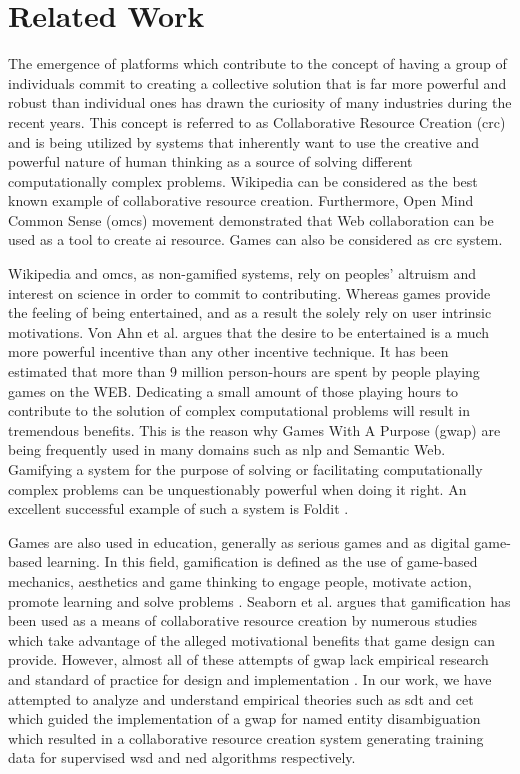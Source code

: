 \section{Related Work}
\label{game:relate-work}
The emergence of platforms which contribute to the concept of having a group of individuals commit to creating a collective solution that is far more powerful and robust than individual ones has drawn the curiosity of many industries during the recent years. This concept is referred to as Collaborative Resource Creation (\ac{crc}) and is being utilized by systems that inherently want to use the creative and powerful nature of human thinking as a source of solving different computationally complex problems. Wikipedia can be considered as the best known example of collaborative resource creation. Furthermore, Open Mind Common Sense (\ac{omcs}) movement demonstrated that Web collaboration can be used as a tool to create \ac{ai} resource. Games can also be considered as \ac{crc} system. \cite{44, 43}

Wikipedia and \ac{omcs}, as non-gamified systems, rely on peoples' altruism and interest on science in order to commit to contributing. Whereas games provide the feeling of being entertained, and as a result the solely rely on user intrinsic motivations. Von Ahn et al. \cite{vonahn} argues that the desire to be entertained is a much more powerful incentive than any other incentive technique. It has been estimated that more than 9 million person-hours are spent by people playing games on the WEB. Dedicating a small amount of those playing hours to contribute to the solution of complex computational problems will result in tremendous benefits. This is the reason why Games With A Purpose (\ac{gwap}) are being frequently used in many domains such as \ac{nlp} and Semantic Web. Gamifying a system for the purpose of solving or facilitating computationally complex problems can be unquestionably powerful when doing it right. An excellent successful example of such a system is Foldit \cite{53}. 

Games are also used in education, generally as serious games and as digital game-based learning. In this field, gamification is defined as the use of game-based mechanics, aesthetics and game thinking to engage people, motivate action, promote learning and solve problems \cite{47}. Seaborn et al. \cite{47} argues that gamification has been used as a means of collaborative resource creation by numerous studies which take advantage of the alleged motivational benefits that game design can provide. However, almost all of these attempts of \ac{gwap} lack empirical research and standard of practice for design and implementation \cite{47}. In our work, we have attempted to analyze and understand empirical theories such as \ac{sdt} and \ac{cet} which guided the implementation of a \ac{gwap} for named entity disambiguation which resulted in a collaborative resource creation system generating training data for supervised \ac{wsd} and \ac{ned} algorithms respectively. 

